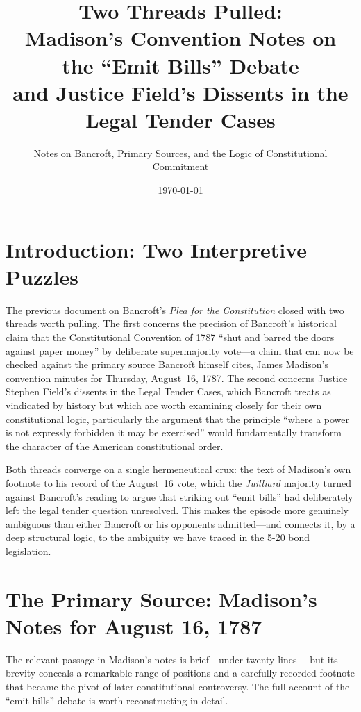 \documentclass[12pt]{article}
\title{Two Threads Pulled:\\[0.5em]
Madison's Convention Notes on the ``Emit Bills'' Debate\\
and Justice Field's Dissents in the Legal Tender Cases}
\author{Notes on Bancroft, Primary Sources, and the Logic of Constitutional Commitment}
\date{\today}
\begin{document}
\maketitle
\thispagestyle{empty}

\newpage
\tableofcontents
\newpage

\section{Introduction: Two Interpretive Puzzles}

The previous document on Bancroft's \textit{Plea for the Constitution}
closed with two threads worth pulling. The first concerns the precision
of Bancroft's historical claim that the Constitutional Convention of 1787
``shut and barred the doors against paper money'' by deliberate
supermajority vote---a claim that can now be checked against the
primary source Bancroft himself cites, James Madison's convention
minutes for Thursday, August~16, 1787. The second concerns Justice
Stephen Field's dissents in the Legal Tender Cases, which Bancroft
treats as vindicated by history but which are worth examining closely
for their own constitutional logic, particularly the argument that the
principle ``where a power is not expressly forbidden it may be
exercised'' would fundamentally transform the character of the American
constitutional order.

Both threads converge on a single hermeneutical crux: the text of Madison's
own footnote to his record of the August~16 vote, which the \textit{Juilliard}
majority turned against Bancroft's reading to argue that striking out
``emit bills'' had deliberately left the legal tender question unresolved.
This makes the episode more genuinely ambiguous than either Bancroft or
his opponents admitted---and connects it, by a deep structural logic, to the
ambiguity we have traced in the 5-20 bond legislation.

\section{The Primary Source: Madison's Notes for August 16, 1787}

The relevant passage in Madison's notes is brief---under twenty lines---
but its brevity conceals a remarkable range of positions and a carefully
recorded footnote that became the pivot of later constitutional
controversy. The full account of the ``emit bills'' debate is worth
reconstructing in detail.
\end{document}
